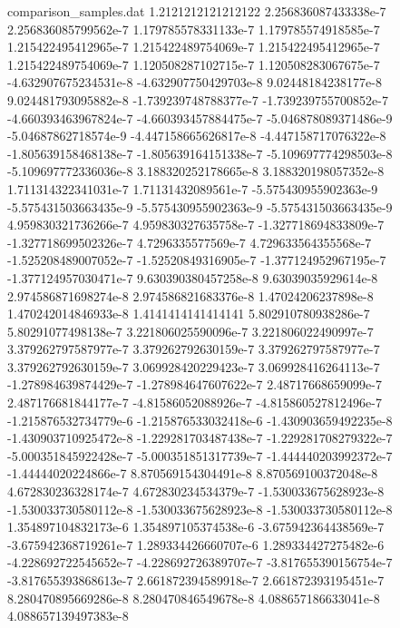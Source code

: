 \begin{filecontents}{comparison_samples.dat}
1.2121212121212122  2.256836087433338e-7    2.256836085799562e-7    1.179785578331133e-7   1.179785574918585e-7   1.215422495412965e-7   1.215422489754069e-7   1.215422495412965e-7   1.215422489754069e-7   1.120508287102715e-7   1.120508283067675e-7   -4.632907675234531e-8   -4.632907750429703e-8   9.02448184238177e-8    9.024481793095882e-8   -1.739239748788377e-7   -1.739239755700852e-7   -4.660393463967824e-7   -4.660393457884475e-7   -5.046878089371486e-9   -5.04687862718574e-9    -4.447158665626817e-8   -4.447158717076322e-8   -1.805639158468138e-7   -1.805639164151338e-7   -5.109697774298503e-8   -5.109697772336036e-8   3.188320252178665e-8   3.188320198057352e-8   1.711314322341031e-7   1.71131432089561e-7    -5.575430955902363e-9   -5.575431503663435e-9   -5.575430955902363e-9   -5.575431503663435e-9   4.959830321736266e-7   4.959830327635758e-7   -1.327718694833809e-7   -1.327718699502326e-7   4.7296335577569e-7     4.729633564355568e-7   -1.525208489007052e-7   -1.52520849316905e-7    -1.377124952967195e-7   -1.377124957030471e-7   9.630390380457258e-8   9.63039035929614e-8    2.974586871698274e-8   2.974586821683376e-8   1.47024206237898e-8     1.470242014846933e-8  
1.4141414141414141  5.802910780938286e-7    5.80291077498138e-7     3.221806025590096e-7   3.221806022490997e-7   3.379262797587977e-7   3.379262792630159e-7   3.379262797587977e-7   3.379262792630159e-7   3.069928420229423e-7   3.069928416264113e-7   -1.278984639874429e-7   -1.278984647607622e-7   2.48717668659099e-7    2.487176681844177e-7   -4.81586052088926e-7    -4.815860527812496e-7   -1.215876532734779e-6   -1.215876533032418e-6   -1.430903659492235e-8   -1.430903710925472e-8   -1.229281703487438e-7   -1.229281708279322e-7   -5.000351845922428e-7   -5.000351851317739e-7   -1.444440203992372e-7   -1.44444020224866e-7    8.870569154304491e-8   8.870569100372048e-8   4.672830236328174e-7   4.672830234534379e-7   -1.530033675628923e-8   -1.530033730580112e-8   -1.530033675628923e-8   -1.530033730580112e-8   1.354897104832173e-6   1.354897105374538e-6   -3.675942364438569e-7   -3.675942368719261e-7   1.289334426660707e-6   1.289334427275482e-6   -4.228692722545652e-7   -4.228692726389707e-7   -3.817655390156754e-7   -3.817655393868613e-7   2.661872394589918e-7   2.661872393195451e-7   8.280470895669286e-8   8.280470846549678e-8   4.088657186633041e-8    4.088657139497383e-8  

\end{filecontents}
